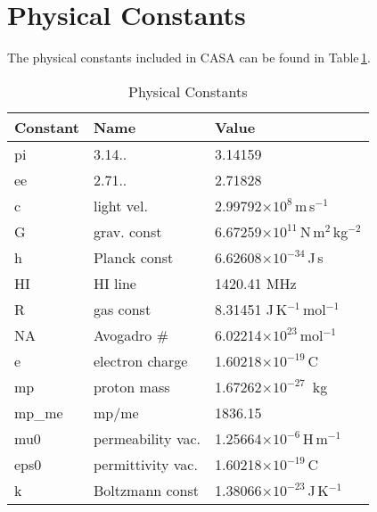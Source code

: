 \begin{table}
\begin{center}
\begin{tabular}{lll}
\end{tabular}
\end{center}
\end{table}

\normalsize


\section{Physical Constants}
\label{section:conv.constants}

The physical constants included in CASA can be found in Table\,\ref{table:conv.constants}.



\begin{table}
\caption{Physical Constants \label{table:conv.constants}}
\begin{center}
\begin{tabular}{lll}\\
Constant & Name & Value \\
\hline
         pi     & 3.14..                  &  3.14159  \\
         ee     & 2.71..                  &  2.71828  \\
         c      & light vel.              &  2.99792$\times10^{8}$\,m\,s$^{-1}$\\  
         G      & grav. const             &  6.67259$\times10^{11}$\,N\,m$^{2}$\,kg$^{-2}$\\  
         h      & Planck const            &  6.62608$\times10^{-34}$\,J\,s  \\
         HI     & HI line                 &  1420.41 MHz  \\
         R      & gas const               &  8.31451 J\,K$^{-1}$\,mol$^{-1}$\\  
         NA     & Avogadro \#              &  6.02214$\times10^{23}$\,mol$^{-1}$\\  
         e      & electron charge         &  1.60218$\times10^{-19}$\,C  \\
         mp     & proton mass             &  1.67262$\times10^{-27}$\, kg  \\
         mp\_me  & mp/me                   &  1836.15  \\
         mu0    & permeability vac.       &  1.25664$\times10^{-6}$\,H\,m$^{-1}$\\  
         eps0   & permittivity vac.       &  1.60218$\times10^{-19}$\,C  \\
         k      & Boltzmann const         &  1.38066$\times10^{-23}$\,J\,K$^{-1}$  \\

\end{tabular}
\end{center}
\end{table}

